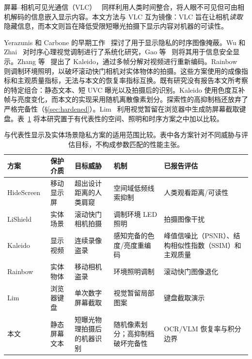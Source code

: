 \documentclass{ieeeaccess}
\begin{document}
屏幕--相机可见光通信（VLC）~\cite{b_nguyen2016,b_tran2021,b_ghiasi2024} 同样利用人类时间整合，将人眼不可见但可由相机解码的信息嵌入显示内容。本文方法与 VLC 互为镜像：VLC 旨在让相机\emph{读取}隐藏信息，而本文则旨在降低受限短曝光拍摄下显示内容对机器的可读性。

Yerazunis 和 Carbone 的早期工作~\cite{b_yerazunis2001} 探讨了用于显示隐私的时序图像掩蔽。Wu 和 Zhai~\cite{b_wu2013} 对时序心理视觉调制进行了系统化研究，Gao 等~\cite{b_gao2014} 则将其用于信息安全显示。Zhang 等~\cite{b_kaleido2015} 提出了 Kaleido，通过多帧分解对视频进行重新编码。Rainbow~\cite{b_rainbow2018} 则调制环境照明，以破坏滚动快门相机对实体物体的拍摄。这些方案使用的成像指标和主观质量指标，无法与本文的恢复率指标互换。既有研究没有报告本文所考察的特定组合：静态文本、短 UVC 曝光以及拍摄后的识别。Kaleido 使用色度互补帧与亮度变化，而本文的实现采用随机离散像素划分。探索性的高抑制档还放弃了严格完备性（\S\ref{sec:hardened}）。Lim~\cite{b_lim2007} 利用视觉暂留在浏览器中生成防屏幕截取键盘。表~\ref{tab:kaleido_compare} 将本研究置于有代表性的空间、照明和时序方案之中加以比较。

\begin{table}[!t]
\caption{与代表性显示及实体场景隐私方案的适用范围比较。表中各方案针对不同威胁与评估目标，不构成参数匹配的性能主张。}
\label{tab:kaleido_compare}
\centering
\footnotesize
\setlength{\tabcolsep}{3.2pt}
\begin{tabular}{p{}p{}p{}p{}p{}}
\toprule
方案 & 保护介质 & 目标威胁 & 机制 & 已报告评估 \\
\midrule
HideScreen~\cite{b_hidescreen2019} & 移动显示屏 & 超出设计距离的人类肩窥 & 空间域低频线索抑制 & 人类观看距离/可读性 \\
LiShield~\cite{b_zhu2017} & 实体场景 & 滚动快门相机拍摄 & 调制环境 LED 照明 & 拍摄图像干扰 \\
Kaleido~\cite{b_kaleido2015} & 显示视频 & 连续录像盗录 & 感知完备的色度/亮度重编码 & 峰值信噪比（PSNR）、结构相似性指数（SSIM）和主观质量 \\
Rainbow~\cite{b_rainbow2018} & 实体物体 & 移动相机盗录 & 环境照明调制 & 滚动快门图像退化 \\
Lim~\cite{b_lim2007} & 浏览器键盘 & 单次数字屏幕截取 & 视觉暂留局部图案 & 键盘截取演示 \\
本文 & 静态屏幕文本 & 短曝光物理拍摄后的机器识别 & 随机像素划分；高抑制档破坏完备性 & OCR/VLM 恢复率与积分边界 \\
\bottomrule
\end{tabular}
\end{table}
\end{document}
